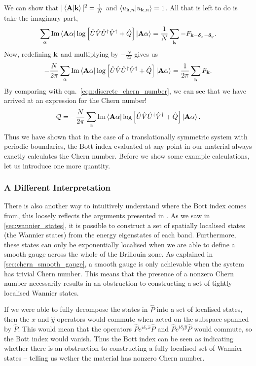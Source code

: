 We can show that $|\braket{\bf A|\bf k}|^2 = \frac{1}{N}$ and $\braket{u_{\bf k, n}|u_{\bf k, n} } = 1$. All that is left to do is take the imaginary part, 
\begin{align}
	\sum_\alpha \Im \bra{\bf A \alpha}\log \left [ \hat U\hat V\hat U^\dag \hat V^\dag + \hat Q \right ]   \ket{\bf A \alpha} = \frac{1}{N} \sum_{\bf k} - F_{\bf k-\boldsymbol{\delta}_x-\boldsymbol{\delta}_y} .
\end{align}
Now, redefining $\bf k$ and multiplying by $-\frac{N}{2\pi}$ gives us
\begin{align}
	-\frac{N}{2\pi} \sum_\alpha \Im \bra{\bf A \alpha}\log \left [ \hat U\hat V\hat U^\dag \hat V^\dag + \hat Q \right ]   \ket{\bf A \alpha} = \frac{1}{2\pi} \sum_{\bf k}  F_{\bf k}.
\end{align}
By comparing with eqn.~\ref{eqn:discrete_chern_number}, we can see that we have arrived at an expression for the Chern number!
\begin{align}
	\mathcal Q = -\frac{N}{2\pi} \sum_\alpha \Im \bra{\bf A \alpha}\log \left [ \hat U\hat V\hat U^\dag \hat V^\dag + \hat Q \right ]   \ket{\bf A \alpha} .
\end{align}
Thus we have shown that in the case of a translationally symmetric system with periodic boundaries, the Bott index evaluated at any point in our material always exactly calculates the Chern number. Before we show some example calculations, let us introduce one more quantity.

\subsubsection{A Different Interpretation}

There is also another way to intuitively understand where the Bott index comes from, this loosely reflects the arguments presented in \cite{hastings_almost_2010}. As we saw in \textsection\ref{sec:wannier_states}, it is possible to construct a set of spatially localised states (the Wannier states) from the energy eigenstates of each band. Furthermore, these states can only be exponentially localised when we are able to define a smooth gauge across the whole of the Brillouin zone. As explained in \textsection\ref{sec:chern_smooth_gauge}, a smooth gauge is only achievable when the system has trivial Chern number. This means that the presence of a nonzero Chern number necessarily results in an obstruction to constructing a set of tightly localised Wannier states.\par
 If we were able to fully decompose the states in $\hat P$ into a set of localised states, then the $\hat x$ and $\hat y$ operators would commute when acted on the subspace spanned by $\hat P$. This would mean that the operators $\hat P e^{i \delta_x \hat x}\hat P $ and $\hat P e^{i \delta_y \hat y}\hat P $ would commute, so the Bott index would vanish. Thus the Bott index can be seen as indicating whether there is an obstruction to constructing a fully localised set of Wannier states -- telling us wether the material has nonzero Chern number.

